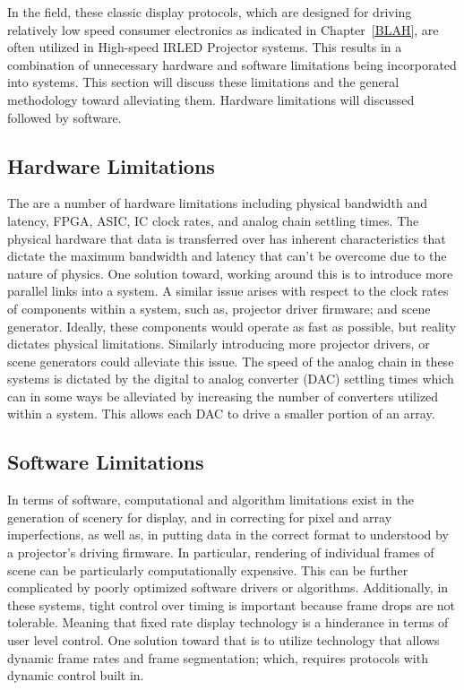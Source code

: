     In the field, these classic display protocols, which are designed for driving relatively low speed consumer electronics as indicated in Chapter~\ref{BLAH}, are often utilized in High-speed IRLED Projector systems. This results in a combination of unnecessary hardware and software limitations being incorporated into systems. This section will discuss these limitations and the general methodology toward alleviating them. Hardware limitations will discussed followed by software.

    \subsection{Hardware Limitations}
        The are a number of hardware limitations including physical bandwidth and latency, FPGA, ASIC, IC clock rates, and analog chain settling times. The physical hardware that data is transferred over has inherent characteristics that dictate the maximum bandwidth and latency that can't be overcome due to the nature of physics. One solution toward, working around this is to introduce more parallel links into a system. A similar issue arises with respect to the clock rates of components within a system, such as, projector driver firmware; and scene generator. Ideally, these components would operate as fast as possible, but reality dictates physical limitations. Similarly introducing more projector drivers, or scene generators could alleviate this issue. The speed of the analog chain in these systems is dictated by the digital to analog converter (DAC) settling times which can in some ways be alleviated by increasing the number of converters utilized within a system. This allows each DAC to drive a smaller portion of an array.

    \subsection{Software Limitations}
        In terms of software, computational and algorithm limitations exist in the generation of scenery for display, and in correcting for pixel and array imperfections, as well as, in putting data in the correct format to understood by a projector's driving firmware. In particular, rendering of individual frames of scene can be particularly computationally expensive. This can be further complicated by poorly optimized software drivers or algorithms. Additionally, in these systems, tight control over timing is important because frame drops are not tolerable. Meaning that fixed rate display technology is a hinderance in terms of user level control. One solution toward that is to utilize technology that allows dynamic frame rates and frame segmentation; which, requires protocols with dynamic control built in.



